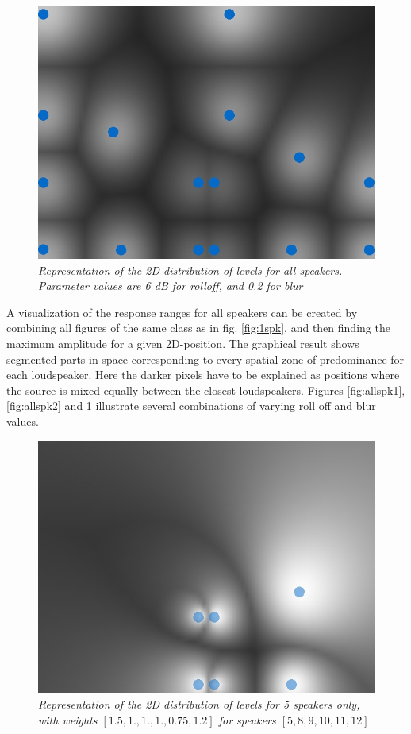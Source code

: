 \documentclass[twoside,10pt]{article}
\begin{document}
\begin{figure}[ht]
\centerline{\includegraphics[scale=0.5]{all_r_6_b_0_2}}
\caption{{\it Representation of the 2D distribution of levels for all speakers. Parameter values are 6 dB for rolloff, and 0.2 for blur}}  
\label{fig:allspk3}
\end{figure}

A visualization of the response ranges for all speakers can be created by combining all figures of the same class as in fig. \ref{fig:1spk}, and then finding the maximum amplitude for a given 2D-position. The graphical result shows segmented parts in space corresponding to every spatial zone of predominance for each loudspeaker. Here the darker pixels have to be explained as positions where the source is mixed equally between the closest loudspeakers. Figures \ref{fig:allspk1}, \ref{fig:allspk2} and \ref{fig:allspk3} illustrate several combinations of varying roll off and blur values. 

\begin{figure}[ht]
\centerline{\includegraphics[scale=0.5]{spk_groups}}
\caption{{\it Representation of the 2D distribution of levels for 5 speakers only, with weights $[1.5,1.,1.,1.,0.75,1.2]$ for speakers $[5,8,9,10,11,12]$}}  
\label{fig:5spk_weights}
\end{figure}
\end{document}
